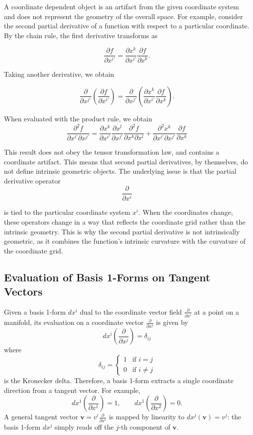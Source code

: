 \documentclass[12pt]{article}
\newcommand{\p}{\partial}
\newcommand{\bv}[1]{\mathbf{#1}}
\begin{document}
A coordinate dependent object is an artifact from the given coordinate system and does not represent the geometry of the overall space. For example, consider the second partial derivative of a function with respect to a particular coordinate. By the chain rule, the first derivative transforms as

\[
\frac{\p f}{\p x^{i'}}
=
\frac{\p x^k}{\p x^{i'}}
\frac{\p f}{\p x^k}.
\]

Taking another derivative, we obtain

\[
\frac{\p}{\p x^{j'}} \left( \frac{\p f}{\p x^{i'}} \right) = \frac{\p}{\p x^{j'}} \left(
\frac{\p x^k}{\p x^{i'}}
\frac{\p f}{\p x^k} \right).
\]

When evaluated with the product rule, we obtain
\[
\frac{\p^2 f}
{\p x^{i'} \p x^{j'}}
=
\frac{\p x^k}{\p x^{i'}}
\frac{\p x^l}{\p x^{j'}}
\frac{\p^2 f}{\p x^k \p x^l}
+
\frac{\p^2 x^k}
{\p x^{i'} \p x^{j'}}
\frac{\p f}{\p x^k}
\]

This result does not obey the tensor transformation law, and contains a coordinate artifact. This means that second partial derivatives, by themselves, do not define intrinsic geometric objects. The underlying issue is that the partial derivative operator
\[
\frac{\p}{\p x^i}
\]

is tied to the particular coordinate system $x^i$. When the coordinates change, these operators change in a way that reflects the coordinate grid rather than the intrinsic geometry. This is why the second partial derivative is not intrinsically geometric, as it combines the function's intrinsic curvature with the curvature of the coordinate grid.

\subsection{Evaluation of Basis 1-Forms on Tangent Vectors}

Given a basis 1-form $dx^i$ dual to the coordinate vector field $\frac{\p}{\p x^i}$ at a point on a manifold, its evaluation on a coordinate vector $\frac{\p}{\p x^j}$ is given by
\[
dx^i \left( \frac{\p}{\p x^j}\right) = \delta_{ij}
\]
where
\[
\delta_{ij} = \begin{cases}
1 & \text{if } i = j \\
0 & \text{if } i \neq j
\end{cases}
\]
is the Kronecker delta. Therefore, a basis 1-form extracts a single coordinate direction from a tangent vector. For example,
\[
dx^1 \left( \frac{\p}{\p x^1}\right) = 1, \qquad dx^1 \left( \frac{\p}{\p x^2}\right) = 0.
\]
A general tangent vector $\bv{v} = v^i \frac{\p}{\p x^i}$ is mapped by linearity to $dx^j(\bv{v}) = v^j$: the basis 1-form $dx^j$ simply reads off the $j$-th component of $\bv{v}$.
\end{document}
